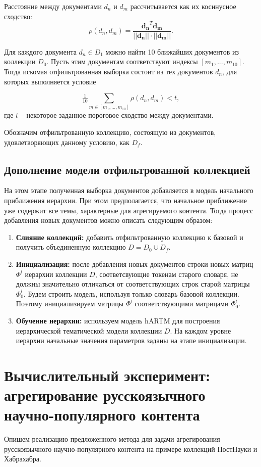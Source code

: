 Расстояние между документами $d_n$ и $d_m$ рассчитывается как их косинусное сходство:
$$\rho(d_n, d_m) = \dfrac{\boldsymbol{d_n }^T \boldsymbol{d_m }}{||\boldsymbol{d_n }|| \cdot ||\boldsymbol{d_m }||}.$$

Для каждого документа $d_n \in D_1$ можно найти 10 ближайших документов из коллекции $D_0$. Пусть этим документам соответствуют индексы $[m_1, ..., m_{10}]$. Тогда искомая отфильтрованная выборка состоит из тех документов $d_n$, для которых выполняется условие

$$\tfrac{1}{10}\sum_{m \in [m_1, ..., m_{10}]}\rho(d_n, d_m) < t,$$
где $t$ -- некоторое заданное пороговое сходство между документами.

Обозначим отфильтрованную коллекцию, состоящую из документов, удовлетворяющих данному условию, как $D_f$.

\subsection{Дополнение модели отфильтрованной коллекцией}
На этом этапе полученная выборка документов добавляется в модель начального приближения иерархии. 
При этом предполагается, что начальное приближение уже содержит все темы, характерные для агрегируемого контента. Тогда процесс добавления новых документов можно описать следующим образом:

\begin{enumerate}
	\item \textbf{Слияние коллекций:} добавить отфильтрованную коллекцию к базовой и получить объединенную коллекцию $D = D_0 \cup D_f$.
	\item \textbf{Инициализация:} после добавления новых документов строки новых матриц $\Phi^l$ иерархии коллекции $D$, соответсвующие токенам старого словаря, не должны значительно отличаться от соответствующих строк старой матрицы $\Phi^l_0$. Будем строить модель, используя только словарь базовой коллекции. Поэтому инициализируем матрицы $\Phi^l$ соответствующими матрицами $\Phi^l_0$.  
	\item \textbf{Обучение иерархии:} используем модель hARTM для построения иерархической тематической модели коллекции $D$. На каждом уровне иерархии начальные значения параметров заданы на этапе инициализации.
\end{enumerate}


\section{Вычислительный эксперимент: агрегирование русскоязычного научно-популярного контента}
Опишем реализацию предложенного метода для задачи агрегирования русскоязычного научно-популярного контента на примере коллекций ПостНауки и Хабрахабра.

